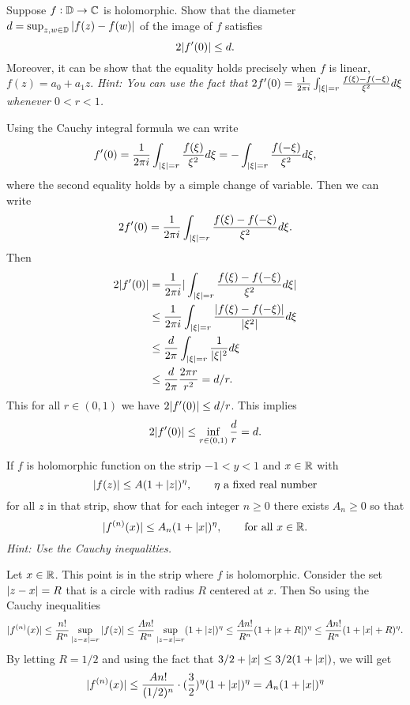 \begin{problem}
	Suppose $ f:\mathbb{D} \to \mathbb{C} $ is holomorphic. Show that the diameter $ d=\sup_{z,w\in\mathbb{D}}|f(z)-f(w)| $ of the image of $ f $ satisfies
	\[ 2|f'(0)| \leq d. \]
	Moreover, it can be show that the equality holds precisely when $ f $ is linear, $ f(z) = a_0 + a_1 z $. \emph{Hint: You can use the fact that $ 2f'(0) = \frac{1}{2\pi i}\int_{|\xi|=r}\frac{f(\xi)-f(-\xi)}{\xi^2}d\xi $ whenever $ 0<r<1 $.}
\end{problem}
\begin{solution}
	Using the Cauchy integral formula we can write
	\[ f'(0) = \frac{1}{2\pi i}\int_{|\xi|=r} \frac{f(\xi)}{\xi^2}d\xi = - \int_{|\xi|=r} \frac{f(-\xi)}{\xi^2}d\xi, \]
	where the second equality holds by a simple change of variable. Then we can write
	\[ 2f'(0) = \frac{1}{2\pi i}\int_{|\xi|=r}\frac{f(\xi)-f(-\xi)}{\xi^2} d\xi. \] 
	Then
	\begin{align*}
		2|f'(0)| &= \frac{1}{2\pi i}|\int_{|\xi|=r}\frac{f(\xi)-f(-\xi)}{\xi^2} d\xi| \\
		&\leq \frac{1}{2\pi i}\int_{|\xi|=r}\frac{|f(\xi)-f(-\xi)|}{|\xi^2|} d\xi\\
		&\leq \frac{d}{2\pi} \int_{|\xi|=r}\frac{1}{|\xi|^2}d\xi \\
		&\leq \frac{d}{2\pi} \frac{2\pi r}{r^2} = d/r. 
	\end{align*}
	This for all $ r \in (0,1) $ we have $ 2|f'(0)|\leq d/r $. This implies
	\[ 2|f'(0)|\leq \inf_{r\in(0,1)}\frac{d}{r} = d. \]
\end{solution}

\begin{problem}
	If $ f $ is holomorphic function on the strip $ -1<y<1 $ and $ x\in \mathbb{R} $ with
	\[ |f(z)|\leq A(1+|z|)^\eta,\qquad \text{$ \eta $ a fixed real number} \]
	for all $ z $ in that strip, show that for each integer $ n\geq 0 $ there exists $ A_n\geq 0 $ so that 
	\[ |f^{(n)}(x)|\leq A_n(1+|x|)^\eta, \qquad \text{for all $ x\in\mathbb{R} $}. \]
	\emph{Hint: Use the Cauchy inequalities.}
\end{problem}
\begin{solution}
	Let $ x\in \mathbb{R} $. This point is in the strip where $ f $ is holomorphic. Consider the set $ |z-x|=R $ that is a circle with radius $ R $ centered at $ x $. Then So using the Cauchy inequalities
	\[ |f^{(n)}(x)|\leq \frac{n!}{R^n}\sup_{|z-x|=r} |f(z)| \leq \frac{An!}{R^n} \sup_{|z-x|=r}(1+|z|)^\eta \leq \frac{An!}{R^n}(1+|x+R|)^\eta\leq \frac{An!}{R^n}(1+|x|+R)^\eta.  \]
	By letting $ R=1/2 $ and using the fact that $ 3/2+|x|\leq 3/2(1+|x|) $, we will get
	\[ |f^{(n)}(x)| \leq \frac{An!}{(1/2)^n}\cdot(\frac{3}{2})^\eta (1+|x|)^\eta = A_n (1+|x|)^\eta \]
\end{solution}